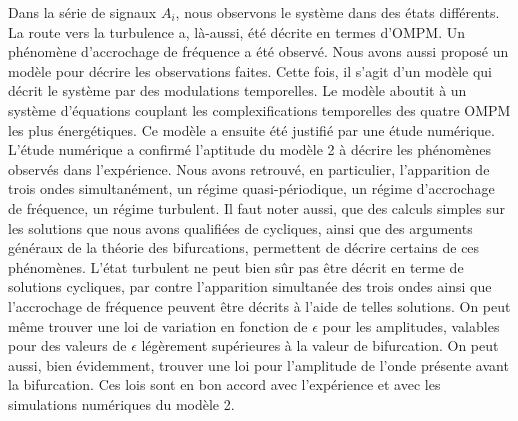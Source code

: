 \documentclass{book}
\begin{document}
Dans la s\'erie de signaux $A_i$, nous observons le
syst\`eme dans des \'etats diff\'erents. La route vers la turbulence
a, l\`a-aussi, \'et\'e d\'ecrite en termes d'OMPM. Un ph\'enom\`ene
d'accrochage de fr\'equence a \'et\'e observ\'e. Nous avons aussi
propos\'e un mod\`ele pour d\'ecrire les observations faites. Cette
fois, il s'agit d'un mod\`ele qui d\'ecrit le syst\`eme par des
modulations temporelles. Le mod\`ele aboutit \`a un syst\`eme
d'\'equations 
couplant les complexifications temporelles des quatre OMPM les plus
\'energ\'etiques. 
Ce mod\`ele a ensuite
\'et\'e  justifi\'e  par une \'etude 
num\'erique. L'\'etude num\'erique a confirm\'e l'aptitude du
mod\`ele 2 \`a d\'ecrire les ph\'enom\`enes observ\'es dans
l'exp\'erience. Nous avons retrouv\'e, en particulier, 
l'apparition de trois ondes simultan\'ement, un r\'egime
quasi-p\'eriodique, un r\'egime d'accrochage de fr\'equence, un r\'egime
turbulent. Il faut noter aussi, que des calculs simples sur les
solutions que nous avons qualifi\'ees de cycliques, ainsi que des
arguments g\'en\'eraux de la th\'eorie des bifurcations, permettent de
d\'ecrire certains de ces ph\'enom\`enes. L'\'etat turbulent ne peut
bien s\^ur pas \^etre d\'ecrit en terme de solutions cycliques, par
contre l'apparition simultan\'ee des trois ondes ainsi que
l'accrochage de fr\'equence peuvent \^etre d\'ecrits \`a l'aide de
telles solutions. On peut m\^eme trouver une loi de variation en
fonction de $\epsilon$ pour les amplitudes, valables pour des valeurs
de $\epsilon$ l\'eg\`erement sup\'erieures \`a la valeur de bifurcation.
On peut aussi,
bien \'evidemment, trouver une loi pour l'amplitude de l'onde
pr\'esente avant la bifurcation. Ces lois sont en bon accord avec
l'exp\'erience et avec les simulations num\'eriques du mod\`ele 2.
\end{document}
